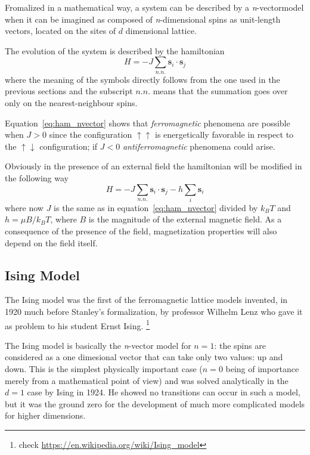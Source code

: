 Fromalized in a mathematical way, a system can be described by a \textit{n}-vectormodel when it can be imagined as  composed of \textit{n}-dimensional spins as unit-length vectors,
located on the sites of $d$ dimensional lattice.

The evolution of the system is described by the hamiltonian
\begin{equation}
	H = - J \sum_{n.n.} \mathbf{s}_i \cdot \mathbf{s}_j
	\label{eq:ham_nvector}
\end{equation}
where the meaning of the symbols directly follows from the one used in the
previous sections and the subscript $n.n.$ means that the summation goes over only
on the nearest-neighbour spins. 

Equation~\ref{eq:ham_nvector} shows that \emph{ferromagnetic} phenomena are  
possible when $J > 0$ since the configuration $\uparrow\uparrow$ is 
energetically favorable in respect to the $\uparrow\downarrow$ configuration; 
if $J < 0$ \emph{antiferromagnetic} phenomena could arise.

Obviously in the presence of an external field the hamiltonian will be modified
in the following way
\begin{equation}
\label{eq:ham_field}
H = - J \sum_{n.n.} \mathbf{s}_i \cdot \mathbf{s}_j - h \sum_i \mathbf{s}_i 
\end{equation}
where now $J$ is the same as in equation~\ref{eq:ham_nvector} divided by $k_B T$ 
and $h = \mu B / k_B T$, where $B$ is the magnitude of the external magnetic field. 
As a consequence of the presence of the field, magnetization properties will also 
depend on the field itself.


\subsection{Ising Model}

The Ising model was the first of the ferromagnetic lattice models invented, in 1920  much 
before Stanley's formalization, by professor Wilhelm Lenz who gave it as 
problem to his student Ernst Ising. \footnote{check \url{
https://en.wikipedia.org/wiki/Ising_model}}

The Ising model is basically the \textit{n}-vector model for $n=1$: the spins
are considered as a one dimesional vector that can take only two values: up and 
down. This is the simplest physically important case ($n=0$ being of importance merely
from a mathematical point of view) and was solved analytically in the $d=1$ case by
Ising in 1924. He showed no transitions can occur in such a model, but it was the
ground zero for the development of much more complicated models for higher
dimensions.


